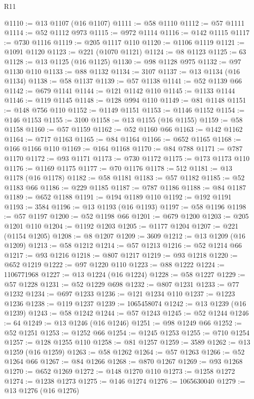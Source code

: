 \begin{lexlean}{R11}
\begin{coremodule}
@1110 := @13 @1107 (@16 @1107)
@1111 := @58 @1110
@1112 := @57 @1111
@1114 := @52 @1112 @973
@1115 := @972 @1114
@1116 := @142 @1115
@1117 := @730 @1116
@1119 := @205 @1117 @110
@1120 := @1106 @1119
@1121 := @1091 @1120
@1123 := @221 (@1070 @1121)
@1124 := @8 @1123
@1125 := 63
@1128 := @13 @1125 (@16 @1125)
@1130 := @98 @1128 @975
@1132 := @97 @1130 @110
@1133 := @88 @1132
@1134 := 3107
@1137 := @13 @1134 (@16 @1134)
@1138 := @58 @1137
@1139 := @57 @1138
@1141 := @52 @1139 @66
@1142 := @679 @1141
@1144 := @121 @1142 @110
@1145 := @1133 @1144
@1146 := @119 @1145
@1148 := @128 @994 @110
@1149 := @81 @1148
@1151 := @148 @756 @110
@1152 := @1149 @1151
@1153 := @1146 @1152
@1154 := @146 @1153
@1155 := 3100
@1158 := @13 @1155 (@16 @1155)
@1159 := @58 @1158
@1160 := @57 @1159
@1162 := @52 @1160 @66
@1163 := @142 @1162
@1164 := @717 @1163
@1165 := @84 @1164
@1166 := @652 @1165
@1168 := @166 @1166 @110
@1169 := @164 @1168
@1170 := @84 @788
@1171 := @787 @1170
@1172 := @93 @1171
@1173 := @730 @1172
@1175 := @173 @1173 @110
@1176 := @1169 @1175
@1177 := @70 @1176
@1178 := 512
@1181 := @13 @1178 (@16 @1178)
@1182 := @58 @1181
@1183 := @57 @1182
@1185 := @52 @1183 @66
@1186 := @229 @1185
@1187 := @787 @1186
@1188 := @84 @1187
@1189 := @652 @1188
@1191 := @194 @1189 @110
@1192 := @192 @1191
@1193 := 3584
@1196 := @13 @1193 (@16 @1193)
@1197 := @58 @1196
@1198 := @57 @1197
@1200 := @52 @1198 @66
@1201 := @679 @1200
@1203 := @205 @1201 @110
@1204 := @1192 @1203
@1205 := @1177 @1204
@1207 := @221 (@1154 @1205)
@1208 := @8 @1207
@1209 := 3609
@1212 := @13 @1209 (@16 @1209)
@1213 := @58 @1212
@1214 := @57 @1213
@1216 := @52 @1214 @66
@1217 := @93 @1216
@1218 := @807 @1217
@1219 := @93 @1218
@1220 := @652 @1219
@1222 := @97 @1220 @110
@1223 := @88 @1222
@1224 := 1106771968
@1227 := @13 @1224 (@16 @1224)
@1228 := @58 @1227
@1229 := @57 @1228
@1231 := @52 @1229 @698
@1232 := @807 @1231
@1233 := @77 @1232
@1234 := @697 @1233
@1236 := @121 @1234 @110
@1237 := @1223 @1236
@1238 := @119 @1237
@1239 := 1065458074
@1242 := @13 @1239 (@16 @1239)
@1243 := @58 @1242
@1244 := @57 @1243
@1245 := @52 @1244
@1246 := 64
@1249 := @13 @1246 (@16 @1246)
@1251 := @98 @1249 @66
@1252 := @52 @1251
@1253 := @1252 @66
@1254 := @1245 @1253
@1255 := @710 @1254
@1257 := @128 @1255 @110
@1258 := @81 @1257
@1259 := 3589
@1262 := @13 @1259 (@16 @1259)
@1263 := @58 @1262
@1264 := @57 @1263
@1266 := @52 @1264 @66
@1267 := @84 @1266
@1268 := @870 @1267
@1269 := @93 @1268
@1270 := @652 @1269
@1272 := @148 @1270 @110
@1273 := @1258 @1272
@1274 := @1238 @1273
@1275 := @146 @1274
@1276 := 1065630040
@1279 := @13 @1276 (@16 @1276)

\end{coremodule}
\end{lexlean}
